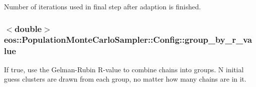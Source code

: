Number of iterations used in final step after adaption is finished. \hypertarget{structeos_1_1PopulationMonteCarloSampler_1_1Config_adf9f35d7f54defd04b9486de7d705ffa}{
\subsubsection[{group\_\-by\_\-r\_\-value}]{$<$double$>$ {\bf eos::PopulationMonteCarloSampler::Config::group\_\-by\_\-r\_\-value}}}
\label{structeos_1_1PopulationMonteCarloSampler_1_1Config_adf9f35d7f54defd04b9486de7d705ffa}
If true, use the Gelman-\/Rubin R-\/value to combine chains into groups. N initial guess clusters are drawn from each group, no matter how many chains are in it.

